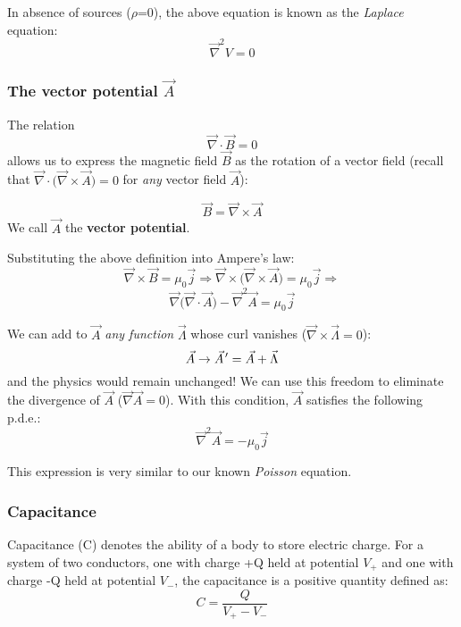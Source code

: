\documentclass[english,11pt]{article}
\newcommand{\pvec}[1]{\vec{#1}\mkern2mu\vphantom{#1}}
\begin{document}
In absence of sources ($\rho$=0), the above equation is known as the {\em Laplace} equation:
\begin{equation*}
      \vec{\nabla}^{2} V = 0
\end{equation*}


\subsubsection*{\bf The vector potential $\vec{A}$}

The relation
\begin{equation*}
      \vec{\nabla} \cdot \vec{B} = 0
\end{equation*}
allows us to express the magnetic field $\vec{B}$ as the rotation of a
vector field (recall that $\vec{\nabla} \cdot \Big( \vec{\nabla} \times \vec{A} \Big) =0$
for {\em any} vector field $\vec{A}$):

\begin{equation*}
      \vec{B} = \vec{\nabla} \times \vec{A}
\end{equation*}
We call $\vec{A}$ the {\bf vector potential}.

Substituting the above definition into Ampere's law:
\begin{equation*}
     \vec{\nabla} \times \vec{B} = \mu_{0} \vec{j} \Rightarrow
     \vec{\nabla} \times \Big( \vec{\nabla} \times \vec{A}  \Big) =  \mu_{0} \vec{j} \Rightarrow
\end{equation*}
\begin{equation*}
     \vec{\nabla} \Big( \vec{\nabla} \cdot \vec{A}  \Big) - \vec{\nabla}^2 \vec{A}   =  \mu_{0} \vec{j}
\end{equation*}

We can add to $\vec{A}$  {\em any function} $\vec{\Lambda}$
whose curl vanishes ($\vec{\nabla} \times \vec{\Lambda} = 0$):
\begin{equation*}
   \vec{A} \rightarrow \pvec{A}' = \vec{A} + \vec{\Lambda}
\end{equation*}
and the physics would remain unchanged!
We can use this freedom to eliminate the divergence of
$\vec{A}$ ($\vec{\nabla} \vec{A} = 0$).
With this condition, $\vec{A}$ satisfies the following p.d.e.:
\begin{equation*}
   \vec{\nabla}^2 \vec{A}   =  - \mu_{0} \vec{j}
\end{equation*}

This expression is very similar to our known {\em Poisson} equation.


\subsubsection*{\bf Capacitance}
Capacitance (C) denotes the ability of a body to store electric charge.
For a system of two conductors, one with charge +Q held at
potential $V_{+}$ and one with charge -Q held at potential $V_{-}$,
the capacitance is a positive quantity defined as:
\begin{equation*}
       C = \frac{Q}{V_{+} - V_{-}}
\end{equation*}
\end{document}

